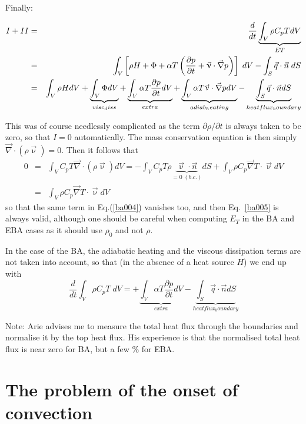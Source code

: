 Finally:

\begin{eqnarray}
I+II
&=&\frac{d}{dt} \underbrace{\int_V \rho C_p T dV }_{ET} \nonumber\\
&=& 
\int_V \left[  \rho H  + \Phi    +\alpha T \left( \frac{\partial p}{\partial t}
+\vec\upnu \cdot \vec{\nabla} p \right) \right] \; dV 
-\int_S  \vec{q} \cdot \vec{n} \;  dS \\ 
&=& 
\int_V \rho H dV 
+\underbrace{\int_V \Phi  dV}_{{visc_diss}}  
+\underbrace{\int_V \alpha T \frac{\partial p}{\partial t}  dV}_{{extra}}
+\underbrace{\int_V \alpha T \vec\upnu  \cdot \vec{\nabla} p  dV}_{{adiab_heating}} 
- \underbrace{\int_S  \vec{q} \cdot \vec{n}  dS}_{{heatflux_boundary}} 
\label{ba005}
\end{eqnarray}

This was of course needlessly complicated as the term $\partial \rho/\partial t$ is always 
taken to be zero, so that $I=0$ automatically. The mass conservation equation is then 
simply ${\vec\nabla}\cdot (\rho \vec{\upnu})=0$. Then it follows that 
\begin{eqnarray}
0&=& \int_V C_p T {\vec\nabla} \cdot (\rho \vec{\upnu}) dV
=
-\int_V C_p T \rho \underbrace{ \vec{\upnu} \cdot \vec{n}}_{=0 \; (b.c.)} dS 
+  \int_V \rho C_p  {\vec\nabla}  T \cdot \vec{\upnu} dV \\
&=&  \int_V \rho C_p  \vec{\nabla}  T \cdot \vec{\upnu} dV 
\end{eqnarray}
so that the same term in Eq.(\ref{ba004}) vanishes too, and then 
Eq.~\eqref{ba005} is always valid, although one should be careful 
when computing $E_T$ in the BA and EBA cases as it should use $\rho_0$ and not $\rho$.

In the case of the BA, the adiabatic heating and the viscous dissipation terms are not 
taken into account, so that (in the absence of a heat source $H$) 
we end up with 
\[
\frac{d}{dt} \int_V \rho C_p T \; dV 
= 
+\underbrace{\int_V \alpha T \frac{\partial p}{\partial t}  dV}_{{extra}}
- \underbrace{\int_S  \vec{q} \cdot \vec{n}  dS}_{{heatflux_boundary}} 
\]


Note: Arie advises me to measure the total heat flux through the boundaries and normalise it 
by the top heat flux. His experience is that the normalised total heat flux is near zero 
for BA, but a few \% for EBA.


\section*{The problem of the onset of convection}

